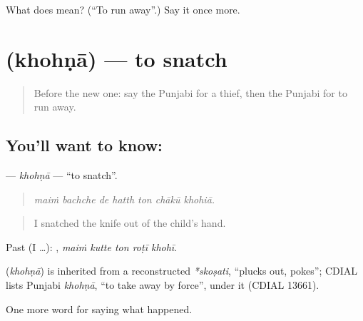 \begin{tcolorbox}[breakable,colback=teal!4,colframe=teal!35!black,title={Before you move on}]
What does  mean? (\textquotedblleft{}To run away\textquotedblright{}.) Say it once more.
\end{tcolorbox}
\section[\texorpdfstring{\pa{ਖੋਹਣਾ} (khohṇā)}{ਖੋਹਣਾ (khohṇā)}]{ (khohṇā) — to snatch}

\label{lesson:PA-C311-khohna}



\begin{quote}
Before the new one: say the Punjabi for a thief, then the Punjabi for to run away.
\end{quote}

\subsection*{You'll want to know: }
\textbf{} — \emph{khohṇā} — \textquotedblleft{}to snatch\textquotedblright{}.

\begin{quote}
      
\end{quote}

\begin{quote}
\emph{maiṁ bachche de hatth ton chākū khohiā.}
\end{quote}

\begin{quote}
I snatched the knife out of the child's hand.
\end{quote}

Past (I …):     , \emph{maiṁ kutte ton roṭī khohī}.

\begin{cousinweb}
\textbf{} (\emph{khohṇā}) is inherited from a reconstructed \emph{*skoṣati}, \textquotedblleft{}plucks out, pokes\textquotedblright{}; CDIAL lists Punjabi \emph{khohṇā}, \textquotedblleft{}to take away by force\textquotedblright{}, under it (CDIAL 13661).
\end{cousinweb}

\begin{grammarlens}[title={What you've built}]
One more word for saying what happened.
\end{grammarlens}


